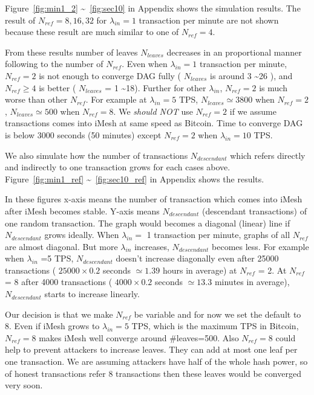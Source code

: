 \documentclass[a4paper,10pt,twocolumn]{article}
\begin{document}
		Figure~\ref{fig:min1_2} \textasciitilde~\ref{fig:sec10} in Appendix shows the simulation results.
	 The result of \( N_{ref}=8,16,32\) for \( \lambda_{in}=1\) transaction per minute are not shown
	 because these result are much similar to  one of \( N_{ref}=4\).

	 From these results number of leaves \( N_{leaves}\) decreases in an proportional manner following to the number of \( N_{ref} \).
	 Even when  \( \lambda_{in}=1\) transaction per minute, \( N_{ref}=2\) is not enough to converge DAG fully
	 (  \( N_{leaves}\) is around 3 \textasciitilde 26 ),
	 and \( N_{ref} \ge 4\)  is better ( \( N_{leaves}\) = 1 \textasciitilde 18).
	 Further for other \( \lambda_{in}\), \( N_{ref}=2\) is much worse than other \( N_{ref}\).
	 For example at \( \lambda_{in}=5\) TPS,  \( N_{leaves} \simeq 3800 \) when \( N_{ref}=2\),
	\( N_{leaves} \simeq 500\)  when \( N_{ref}=8\). We \emph{should NOT} use \( N_{ref}=2\) if we assume 
	transactions comes into iMesh at same speed as Bitcoin.
	Time to converge DAG is below 3000 seconds (50 minutes) except \( N_{ref}=2\) when \( \lambda_{in}=10\) TPS.
 
	 We also simulate how the number of  transactions \( N_{descendant} \) which refers directly and indirectly to one transaction grows 
	 for each cases above. Figure~\ref{fig:min1_ref} \textasciitilde~\ref{fig:sec10_ref} in Appendix shows the results.
	 
	 In these figures x-axis means the number of transaction which comes into iMesh
	 after iMesh becomes stable. Y-axis means \( N_{descendant} \) 
	 (descendant transactions) of one random transaction. The graph would becomes a diagonal (linear) line if \( N_{descendant} \) grows ideally.
	 When  \( \lambda_{in}=\) 1 transaction per minute,   graphs of all \( N_{ref}\) are almost diagonal.
	 But more  \( \lambda_{in}\) increases,  \( N_{descendant} \) becomes less.
	 For example when  \( \lambda_{in}\) =5 TPS,  \( N_{descendant} \) 
	 doesn't increase diagonally even after  25000 transactions  ( \( 25000 \times 0.2\) seconds \(\simeq 1.39 \) hours in average) at \( N_{ref} \)  = 2.
At \( N_{ref}\) = 8 after  4000 transactions  ( \( 4000 \times 0.2\) seconds \(\simeq 13.3 \) minutes in average),
 \( N_{descendant} \) starts to increase linearly.


	 Our decision is that we make \( N_{ref}\) be variable and
	 for now we set the default to 8. 
	 Even if iMesh grows to  \( \lambda_{in}=5\) TPS, which is the maximum TPS
	 in Bitcoin,  \( N_{ref}=8\) makes iMesh well converge around \#leaves=500. 
	 Also \( N_{ref}=8\)  could
	 help to prevent attackers to increase leaves.
	 They can add at most one leaf per one transaction.  We are assuming attackers have half of the whole hash power, so 
	 of honest transactions refer 8 transactions then 
	 these leaves would be converged very soon.
\end{document}
